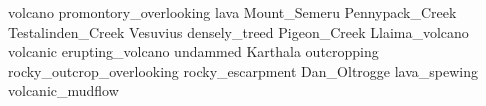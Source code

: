 volcano promontory\_overlooking lava Mount\_Semeru Pennypack\_Creek Testalinden\_Creek Vesuvius densely\_treed Pigeon\_Creek Llaima\_volcano volcanic erupting\_volcano undammed Karthala outcropping rocky\_outcrop\_overlooking rocky\_escarpment Dan\_Oltrogge lava\_spewing volcanic\_mudflow 
